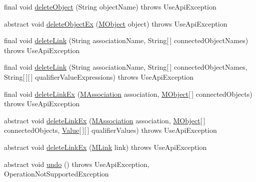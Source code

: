 \begin{DoxyCompactItemize}
final void \hyperlink{classorg_1_1tzi_1_1use_1_1api_1_1_use_system_api_a00acf451f91e54813ff58b06aba8e00f}{delete\-Object} (String object\-Name)  throws Use\-Api\-Exception 
\item 
abstract void \hyperlink{classorg_1_1tzi_1_1use_1_1api_1_1_use_system_api_a6623feabe990d434cbba1f15b8457235}{delete\-Object\-Ex} (\hyperlink{interfaceorg_1_1tzi_1_1use_1_1uml_1_1sys_1_1_m_object}{M\-Object} object)  throws Use\-Api\-Exception
\item 
final void \hyperlink{classorg_1_1tzi_1_1use_1_1api_1_1_use_system_api_ab48bd0420150ffef1609492cbee196b8}{delete\-Link} (String association\-Name, String\mbox{[}$\,$\mbox{]} connected\-Object\-Names)  throws Use\-Api\-Exception 
\item 
final void \hyperlink{classorg_1_1tzi_1_1use_1_1api_1_1_use_system_api_a6806746758659ccd4ec59ea5c0b743c7}{delete\-Link} (String association\-Name, String\mbox{[}$\,$\mbox{]} connected\-Object\-Names, String\mbox{[}$\,$\mbox{]}\mbox{[}$\,$\mbox{]} qualifier\-Value\-Expressions)  throws Use\-Api\-Exception 
\item 
final void \hyperlink{classorg_1_1tzi_1_1use_1_1api_1_1_use_system_api_af62722e3307f91449c4c809438029d1f}{delete\-Link\-Ex} (\hyperlink{interfaceorg_1_1tzi_1_1use_1_1uml_1_1mm_1_1_m_association}{M\-Association} association, \hyperlink{interfaceorg_1_1tzi_1_1use_1_1uml_1_1sys_1_1_m_object}{M\-Object}\mbox{[}$\,$\mbox{]} connected\-Objects)  throws Use\-Api\-Exception 
\item 
abstract void \hyperlink{classorg_1_1tzi_1_1use_1_1api_1_1_use_system_api_a0c58bb028c4d298cdf3f94f242a3760c}{delete\-Link\-Ex} (\hyperlink{interfaceorg_1_1tzi_1_1use_1_1uml_1_1mm_1_1_m_association}{M\-Association} association, \hyperlink{interfaceorg_1_1tzi_1_1use_1_1uml_1_1sys_1_1_m_object}{M\-Object}\mbox{[}$\,$\mbox{]} connected\-Objects, \hyperlink{classorg_1_1tzi_1_1use_1_1uml_1_1ocl_1_1value_1_1_value}{Value}\mbox{[}$\,$\mbox{]}\mbox{[}$\,$\mbox{]} qualifier\-Values)  throws Use\-Api\-Exception
\item 
abstract void \hyperlink{classorg_1_1tzi_1_1use_1_1api_1_1_use_system_api_a80fc78e8b271e546fd38f32e00d5f966}{delete\-Link\-Ex} (\hyperlink{interfaceorg_1_1tzi_1_1use_1_1uml_1_1sys_1_1_m_link}{M\-Link} link)  throws Use\-Api\-Exception
\item 
abstract void \hyperlink{classorg_1_1tzi_1_1use_1_1api_1_1_use_system_api_aaa63715864a74ce3c8550318b16cb289}{undo} ()  throws Use\-Api\-Exception, Operation\-Not\-Supported\-Exception
\item 

\end{DoxyCompactItemize}
